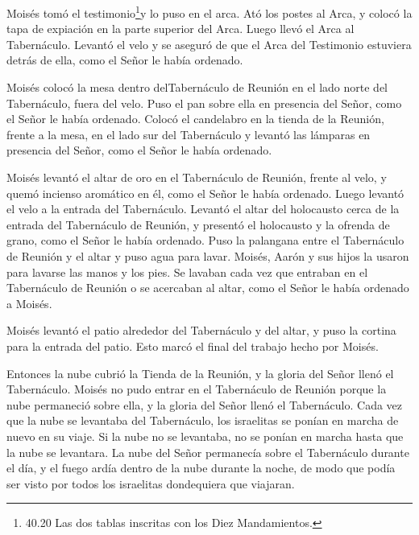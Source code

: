 Moisés tomó el testimonio\footnote{40.20 Las dos tablas
  inscritas con los Diez Mandamientos.}y lo puso en el arca. Ató los
postes al Arca, y colocó la tapa de expiación en la parte superior del
Arca.  Luego llevó el Arca al Tabernáculo. Levantó el velo
y se aseguró de que el Arca del Testimonio estuviera detrás de ella,
como el Señor le había ordenado.

 Moisés colocó la mesa dentro delTabernáculo de Reunión en
el lado norte del Tabernáculo, fuera del velo.  Puso el pan
sobre ella en presencia del Señor, como el Señor le había ordenado.
 Colocó el candelabro en la tienda de la Reunión, frente a
la mesa, en el lado sur del Tabernáculo  y levantó las
lámparas en presencia del Señor, como el Señor le había ordenado.

 Moisés levantó el altar de oro en el Tabernáculo de
Reunión, frente al velo,  y quemó incienso aromático en él,
como el Señor le había ordenado.  Luego levantó el velo a
la entrada del Tabernáculo.  Levantó el altar del
holocausto cerca de la entrada del Tabernáculo de Reunión, y presentó el
holocausto y la ofrenda de grano, como el Señor le había ordenado.
 Puso la palangana entre el Tabernáculo de Reunión y el
altar y puso agua para lavar.  Moisés, Aarón y sus hijos la
usaron para lavarse las manos y los pies.  Se lavaban cada
vez que entraban en el Tabernáculo de Reunión o se acercaban al altar,
como el Señor le había ordenado a Moisés.

 Moisés levantó el patio alrededor del Tabernáculo y del
altar, y puso la cortina para la entrada del patio. Esto marcó el final
del trabajo hecho por Moisés.

 Entonces la nube cubrió la Tienda de la Reunión, y la
gloria del Señor llenó el Tabernáculo.  Moisés no pudo
entrar en el Tabernáculo de Reunión porque la nube permaneció sobre
ella, y la gloria del Señor llenó el Tabernáculo.  Cada vez
que la nube se levantaba del Tabernáculo, los israelitas se ponían en
marcha de nuevo en su viaje.  Si la nube no se levantaba,
no se ponían en marcha hasta que la nube se levantara.  La
nube del Señor permanecía sobre el Tabernáculo durante el día, y el
fuego ardía dentro de la nube durante la noche, de modo que podía ser
visto por todos los israelitas dondequiera que viajaran.

